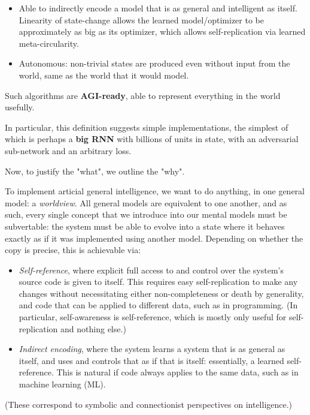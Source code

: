 \documentclass{article}
\begin{document}
\begin{itemize}
\begin{itemize}
\item Able to indirectly encode a model that is as general and intelligent as itself. Linearity of state-change allows the learned model/optimizer to be approximately as big as its optimizer, which allows self-replication via learned meta-circularity.
\item Autonomous: non-trivial states are produced even without input from the world, same as the world that it would model.
\end{itemize}
\end{itemize}

Such algorithms are \textbf{AGI-ready}, able to represent everything in the world usefully.

In particular, this definition suggests simple implementations, the simplest of which is perhaps a \textbf{big RNN} with billions of units in state, with an adversarial sub-network and an arbitrary loss.

Now, to justify the "what", we outline the "why".

To implement articial general intelligence, we want to do anything, in one general model: a \textit{worldview}. All general models are equivalent to one another, and as such, every single concept that we introduce into our mental models must be subvertable: the system must be able to evolve into a state where it behaves exactly as if it was implemented using another model. Depending on whether the copy is precise, this is achievable via:

\begin{itemize}
\item \textit{Self-reference}, where explicit full access to and control over the system's source code is given to itself. This requires easy self-replication to make any changes without necessitating either non-completeness or death by generality, and code that can be applied to different data, such as in programming. (In particular, self-awareness is self-reference, which is mostly only useful for self-replication and nothing else.)
\item \textit{Indirect encoding}, where the system learns a system that is as general as itself, and uses and controls that as if that is itself: essentially, a learned self-reference. This is natural if code always applies to the same data, such as in machine learning (ML).
\end{itemize}

(These correspond to symbolic and connectionist perspectives on intelligence.)
\end{document}
